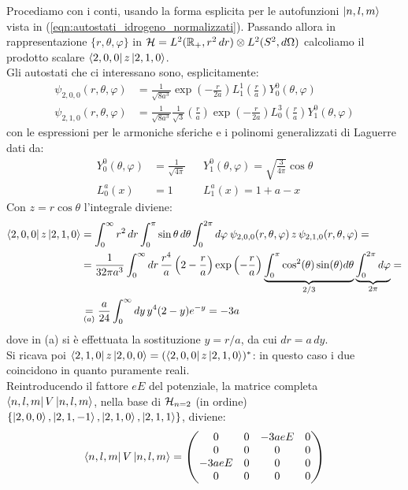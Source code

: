 \documentclass[../../FisicaTeorica.tex]{subfiles}
\begin{document}
Procediamo con i conti, usando la forma esplicita per le autofunzioni $\Ket{n,l,m}$ vista in (\ref{eqn:autostati_idrogeno_normalizzati}). Passando allora in rappresentazione $\{r,\theta,\varphi\}$ in $\mathcal{H}=L^2(\mathbb{R}_+, r^2\,dr)\otimes L^2(S^2,d\Omega)$ calcoliamo il prodotto scalare $\Bra{2,0,0}z\Ket{2,1,0}$.\\
Gli autostati che ci interessano sono, esplicitamente:
\begin{align*}
\psi_{2,0,0}(r,\theta,\varphi)&=\frac{1}{\sqrt{8a^3}}\exp\left(-\frac{r}{2a}\right)L_1^1\left(\frac{r}{a}\right)Y_0^0(\theta,\varphi)\\
\psi_{2,1,0}(r,\theta,\varphi)&=\frac{1}{\sqrt{8a^3}}\frac{1}{\sqrt{3}}\left(\frac{r}{a}\right)\exp\left(-\frac{r}{2a}\right)L_0^3\left(\frac{r}{a}\right)Y_1^0(\theta,\varphi)
\end{align*}
con le espressioni per le armoniche sferiche e i polinomi generalizzati di Laguerre dati da:
\begin{align*}
Y_0^0(\theta,\varphi) &= \frac{1}{\sqrt{4\pi}}&& Y_1^0(\theta,\varphi) = \sqrt{\frac{3}{4\pi}}\cos\theta\\
L_0^a(x) &= 1 && L_1^a(x) = 1+a -x
\end{align*}
Con $z=r\cos\theta$ l'integrale diviene:     
\begin{align*}
\Bra{2,0,0}z \Ket{2,1,0} &= \int_0^{\infty}r^2\, dr \int_{0}^\pi \sin\theta\, d\theta \int_0^{2\pi}d\varphi \> \psi_{2,0,0}(r,\theta,\varphi)\,z\,\psi_{2,1,0}(r,\theta,\varphi)=\\
&=\frac{1}{32\pi a^3} \int_0^{\infty} dr\, \frac{r^4}{a}\left(2-\frac{r}{a}\right) \exp\left(-\frac{r}{a}\right) \underbrace{\int_0^\pi \cos^2(\theta)\sin(\theta) d\theta}_{2/3} \underbrace{\int_0^{2\pi} d\varphi}_{2\pi} =\\
&\underset{(a)}{=}\frac{a}{24}\int_0^{\infty}dy\, y^4 (2-y)e^{-y} =-3a
\end{align*}
dove in (a) si è effettuata la sostituzione $y = r/a$, da cui $dr = a\,dy$.\\
Si ricava poi $\Bra{2,1,0}z\Ket{2,0,0}=(\Bra{2,0,0}z\Ket{2,1,0})^*$: in questo caso i due coincidono in quanto puramente reali.\\
Reintroducendo il fattore $eE$ del potenziale, la matrice completa $\Bra{n,l,m}V\Ket{n,l,m}$, nella base di $\mathcal{H}_{n=2}$ (in ordine) $\{\Ket{2,0,0}, \Ket{2,1,-1}, \Ket{2,1,0}, \Ket{2,1,1}\}$, diviene:
\begin{align*}
\Bra{n,l,m}V\Ket{n,l,m}=
\begin{pmatrix}
0 & 0 & -3aeE & 0\\
0 & 0 & 0 & 0\\
-3aeE & 0 & 0 & 0\\
0 & 0 & 0 & 0
\end{pmatrix}
\end{align*}
\end{document}
